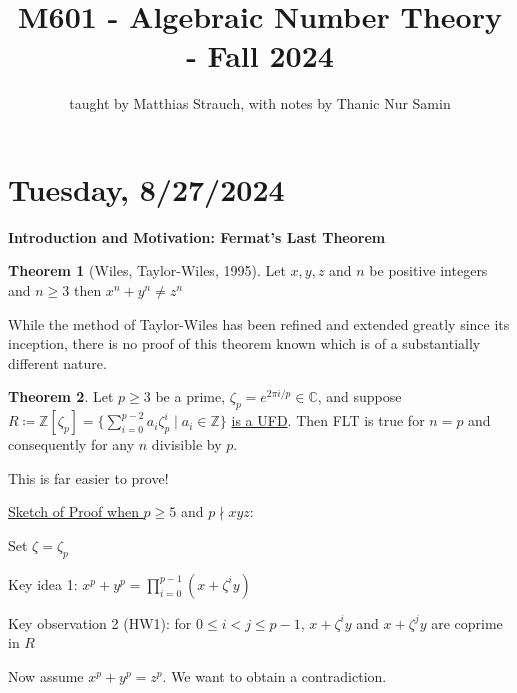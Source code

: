 \documentclass[openany]{amsbook}
\title{M601 - Algebraic Number Theory - Fall 2024}
\author{taught by Matthias Strauch, with notes by Thanic Nur Samin}
\date{\vspace{-5ex}}
\numberwithin{section}{chapter}
\theoremstyle{definition}
\newtheorem{theorem}{Theorem}[chapter]
\begin{document}
\pagestyle{fancy}


\fancyhead[L]{\leftmark}


\maketitle

\tableofcontents

\section*{Tuesday, 8/27/2024}

\begin{center}
{\bf Introduction and Motivation: Fermat's Last Theorem}
\end{center}

\begin{theorem}
    [Wiles, Taylor-Wiles, 1995]

    Let \(x,y,z\) and \(n\) be positive integers and \(n \geq 3\) then \(x^n + y^n \neq z^n\) 
\end{theorem}

While the method of Taylor-Wiles has been refined and extended greatly since its inception, there is no proof of this theorem known which is of a   substantially different nature.

\begin{theorem}
    Let \(p\geq 3\) be a prime, \(\zeta_p = e^{2\pi i / p} \in \mathbb{C}\), and suppose \(R \coloneqq \mathbb{Z}[\zeta_p] = \{ \sum_{i=0}^{p-2} a_i \zeta_p^i \mid a_i\in \mathbb{Z} \} \) \underline{is a UFD}. Then FLT is true for \(n = p\) and consequently for any \(n\) divisible by \(p\). 
\end{theorem}

This is far easier to prove!

\underline{Sketch of Proof when \(p \geq 5\)} and \(p \nmid x y z\):

Set \(\zeta = \zeta_p\)

Key idea 1: \(x^p + y^p = \prod_{i=0}^{p-1} (x + \zeta^i y)\) 

Key observation 2 (HW1): for \(0 \leq i < j \leq p-1\), \(x + \zeta^i y\) and \(x + \zeta^j y\) are coprime in \(R\)

Now assume \(x^p + y^p = z^p\). We want to obtain a contradiction.
\end{document}
